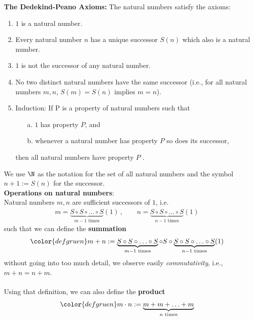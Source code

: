 {	\color{defgruen}
	\textbf{The Dedekind-Peano Axioms:} The natural numbers satisfy the axioms:
	\begin{enumerate} 
		\item $1$ is a natural number.
		\item  Every natural number $n$ has a unique successor $S(n)$ which also is a natural
		number.
		\item  $1$ is not the successor of any natural number.
		\item No two distinct natural numbers have the same successor (i.e., for all natural
		numbers $m, n$, $S(m)= S(n)$ implies $m=n$).
		\item Induction: If P is a property of natural numbers such that
		\begin{itemize}
			\item[a.] $1$ has property $P$, and
			\item[b.] whenever a natural number has property $P$ so does its successor,
		\end{itemize}
		then all natural numbers have property $P$ .
	\end{enumerate}
	We use $\N$ as the notation for the set of all natural numbers and the symbol $n+1:=S(n)$ for the successor.
	~\\
	\textbf{Operations on natural numbers}: \\[10pt]
	Natural numbers $m,n$ are sufficient successors of $1$, i.e.
	\begin{align*}
	m=\underbrace{S\circ S\circ \ldots \circ S}_{m-1\text{ times}}(1)\, ,\qquad
	n=\underbrace{S\circ S\circ \ldots \circ S}_{n-1\text{ times}}(1)
	\end{align*}  
	such that we can define the \textbf{summation}
	\begin{align*}\color{defgruen}
	m+n:=\underbrace{S\circ S\circ \ldots \circ S}_{m-1\text{ times}}\circ S\circ \underbrace{S\circ S\circ \ldots \circ S}_{n-1\text{ times}}(1)
	\end{align*}  
	without going into too much detail, we observe easily \textit{commutativity}, i.e., {\color{satzrot}$m+n=n+m$}. 
	~\\~\\
	Using that definition, we can also define the \textbf{product}
	\begin{align*}\color{defgruen}
	m\cdot n:=\underbrace{m+m+\ldots +m}_{n\text{ times}}

\end{align*}}
